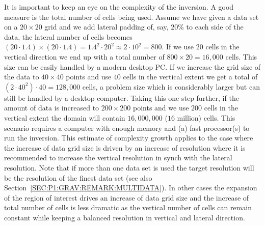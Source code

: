 It is important to keep an eye on the complexity of the inversion.
A good measure is the total number of cells being used.
Assume we have given a data set on a $20 \times 20$ grid and we add lateral
padding of, say, $20 \%$ to each side of the data, the lateral number of cells
becomes $(20\cdot 1.4)\times (20\cdot 1.4)=1.4^2\cdot 20^2\approx 2\cdot 10^2=800$.
If we use $20$ cells in the vertical direction we end up with a total number
of $800 \times 20 = 16,000$ cells.
This size can be easily handled by a modern desktop PC.
If we increase the grid size of the data to $40 \times 40$ points and use $40$
cells in the vertical extent we get a total of $(2\cdot 40^2)\cdot 40=128,000$
cells, a problem size which is considerably larger but can still be handled by
a desktop computer.
Taking this one step further, if the amount of data is increased to
$200\times 200$ points and we use $200$ cells in the vertical extent the
domain will contain $16,000,000$ ($16$ million) cells.
This scenario requires a computer with enough memory and (a) fast processor(s)
to run the inversion.
This estimate of complexity growth applies to the case where the increase
of data grid size is driven by an increase of resolution where it is
recommended to increase the vertical resolution in synch with the lateral
resolution. Note that if more than one data set is used the target resolution
will be the resolution of the finest data set (see also
Section~\ref{SEC:P1:GRAV:REMARK:MULTIDATA}).
In other cases the expansion of the region of interest drives an increase of
data grid size and the increase of total number of cells is less dramatic as
the vertical number of cells can remain constant while keeping a balanced
resolution in vertical and lateral direction.

